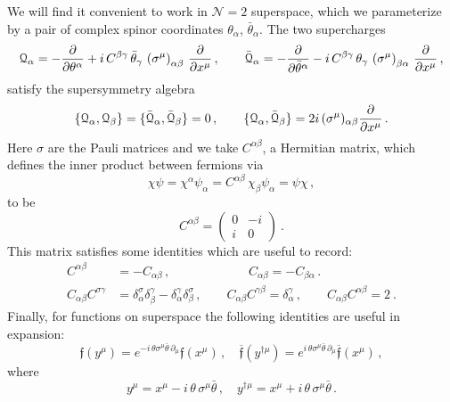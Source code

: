 \documentclass[11pt]{article}
\newcommand{\thetab}{\bar{\theta}}
\newcommand{\Q}{\mathcal{Q}}
\newcommand{\Qb}{\bar{\mathcal{Q}}}
\begin{document}
We will find it convenient to work in $\mathcal{N}=2$ superspace, which we parameterize by a pair of complex spinor coordinates $\theta_\alpha$, $\thetab_\alpha$.  The two supercharges  
%
\begin{equation}
\Q_\alpha  =-\pdv{}{\theta^\alpha}+ i\,C^{\beta\gamma} \, \thetab_\gamma\, \left(\sigma^\mu\right)_{\alpha \beta}\, \pdv{}{x^\mu} \,,
\qquad
\Qb_\alpha  =-\pdv{}{\thetab^\alpha}- i\,C^{\beta\gamma} \, \theta_\gamma\, \left(\sigma^\mu\right)_{ \beta \alpha}\, \pdv{}{x^\mu} \,,
\end{equation}	
%
satisfy the supersymmetry algebra
%
\begin{equation}
\{\Q_\alpha, \Q_\beta\}=  \{\Qb_\alpha,\Qb_\beta\}=0\,,\qquad
\{\Q_\alpha,\Qb_\beta\}=2i\,(\sigma^\mu)_{\alpha\beta} \pdv{}{x^\mu} \,.
\end{equation}	
%
Here $\sigma$ are the Pauli matrices and we take $C^{\alpha\beta}$, a Hermitian matrix, which defines the inner product between fermions via
%
\begin{equation}
\chi \psi = \chi^\alpha \psi_\alpha = C^{\alpha\beta}\,  \chi_\beta \psi_\alpha = \psi \chi \,,
\end{equation}
%
to be
%
\begin{equation}
C^{\alpha\beta} = 
\begin{pmatrix}
0 & -i\\
i & 0 
\end{pmatrix} \ .
\end{equation}	
%
This matrix satisfies some identities which are useful to record:
%
\begin{equation}
\begin{split}
C^{\alpha\beta} & =-C_{\alpha\beta}\,, 
\qquad \qquad \qquad \;
C_{\alpha\beta}=-C_{\beta\alpha}\,. \\
C_{\alpha\beta}C^{\sigma\gamma}&=\delta_\alpha^\sigma\delta_\beta^\gamma - \delta_\alpha^\gamma\delta_\beta^\sigma\,,
\qquad C_{\alpha\beta}C^{\gamma\beta}=\delta_\alpha^\gamma\,,
\qquad  C_{\alpha\beta}C^{\alpha\beta}=2\ .
\end{split}
\end{equation}	
%
Finally, for functions on superspace the following identities are useful in expansion:
%
\begin{equation}\label{eq:susyexp}
\mathfrak{f}(y^\mu) 
= 
	e^{-i\, \theta \sigma^\mu \thetab \, \partial_\mu} \mathfrak{f}(x^\mu)\,, \quad
\overline{\mathfrak{f}}(y^{\dagger\mu}) 
= 
	e^{i\, \theta \sigma^\mu \thetab \, \partial_\mu} \overline{\mathfrak{f}}(x^\mu) \,,
\end{equation}	
%
where
%
\begin{equation}
y^\mu = x^\mu - i\, \theta\, \sigma^\mu \thetab\,,\quad  y^{\dagger \mu}  = x^\mu + i\, \theta\, \sigma^\mu \thetab\,.
\end{equation}
%
\end{document}
